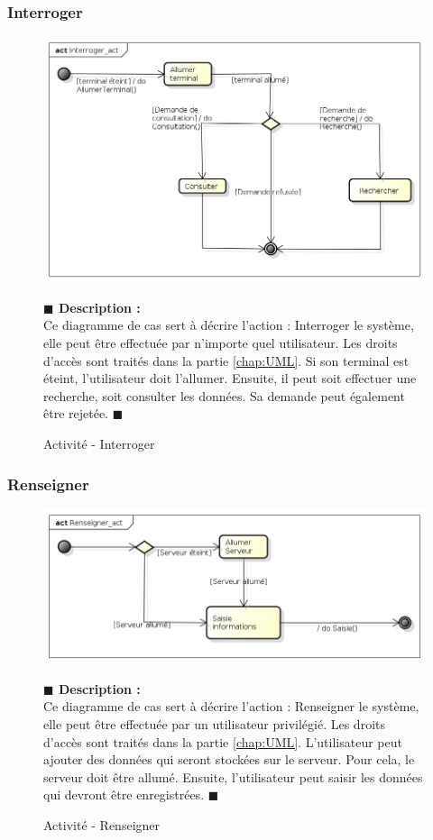 \documentclass[11pt, titlepage]{report}
\newcommand{\debutDescription}{\noindent\textbf{\textcolor{DescriptionColor}{$\blacksquare$  Description : \\}}}
\newcommand{\finDescription}{\noindent\textcolor{DescriptionColor}{$\blacksquare$}}
\begin{document}
\subsubsection{Interroger}
\begin{figure}[h!]
\begin{center}
\includegraphics[scale=.4]{../images/diagrammes/sysml/activite/interroger.png} 
\caption{Activité - Interroger}
\end{center}
\debutDescription
Ce diagramme de cas sert à décrire l'action : Interroger le système, elle peut être effectuée par n'importe quel utilisateur. Les droits d'accès sont traités dans la partie \ref{chap:UML}. Si son terminal est éteint, l'utilisateur doit l'allumer. Ensuite, il peut soit effectuer une recherche, soit consulter les données. Sa demande peut également être rejetée.
\finDescription
\end{figure}

\subsubsection{Renseigner}
\begin{figure}[h!]
\begin{center}
\includegraphics[scale=.4]{../images/diagrammes/sysml/activite/renseigner.png} 
\caption{Activité - Renseigner}
\end{center}
\debutDescription
Ce diagramme de cas sert à décrire l'action : Renseigner le système, elle peut être effectuée par un utilisateur privilégié. Les droits d'accès sont traités dans la partie \ref{chap:UML}. L'utilisateur peut ajouter des données qui seront stockées sur le serveur. Pour cela, le serveur doit être allumé. Ensuite, l'utilisateur peut saisir les données qui devront être enregistrées.
\finDescription
\end{figure}
\end{document}
